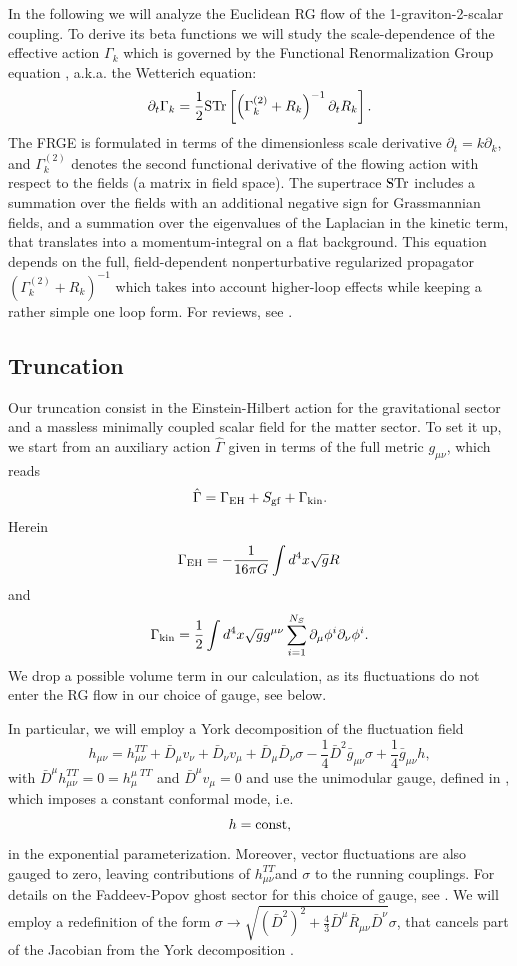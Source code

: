 \documentclass[11pt]{book} %
\newcommand{\be}{\begin{equation}}
\newcommand{\ee}{\end{equation}}
\begin{document}
In the following we will analyze the Euclidean RG flow of the 1-graviton-2-scalar coupling.
To derive its beta functions we will study the scale-dependence of the effective action $\Gamma_k$ which is governed by the Functional Renormalization Group equation \cite{Wetterich:1993yh, Morris:1993qb},  a.k.a. the Wetterich equation:
\be
\partial_t \Gamma_k = \frac{1}{2} {\rm STr} \left[\left( \Gamma_k^{(2)}+R_k\right)^{-1} \partial_t R_k \right].
\ee
The FRGE is formulated in terms of the dimensionless scale derivative $\partial_t = k\partial_k$, and $\Gamma_k^{(2)}$ denotes the second functional derivative of the flowing action with respect to the fields (a matrix in field space).
The supertrace $\rm STr$ includes a summation over the fields with an additional negative sign for Grassmannian fields, and a summation over the eigenvalues of the Laplacian in the kinetic term, that translates into a momentum-integral on a flat background.
This equation depends on the full, field-dependent nonperturbative regularized propagator $\left(\Gamma_k^{(2)}+R_k \right)^{-1}$ which takes into account higher-loop effects while keeping a  rather simple  one loop form.  For reviews, see \cite{FRGreviews}.

%
\subsection{Truncation}
%
Our truncation consist in the Einstein-Hilbert action for the gravitational sector and a massless minimally coupled scalar field for the matter sector. To set it up, we start from an  auxiliary action $\hat{\Gamma}$ given in terms of the full metric $g_{\mu \nu}$, which reads
\be
\hat{\Gamma}= \Gamma_{\rm EH}+ S_{\rm gf} + \Gamma_{\rm kin}.
\ee
Herein
\be
\Gamma_{\rm EH} = -\frac{1}{16 \pi G} \int d^4x \sqrt{g} R\,
\ee
and
\be
\Gamma_{\rm kin} = \frac{1}{2} \int d^4x \sqrt{g} g^{\mu \nu}\sum_{i=1}^{N_S}\partial_{\mu}\phi^i \partial_{\nu}\phi^i.
\ee
We drop a possible volume term in our calculation, as its fluctuations do not enter the RG flow in our choice of gauge, see below.

In particular, we will employ a York decomposition of the fluctuation field
\be
h_{\mu \nu} = h_{\mu \nu}^{TT} + \bar{D}_{\mu}v_{\nu}+ \bar{D}_{\nu}v_{\mu} + \bar{D}_{\mu}\bar{D}_{\nu}\sigma - \frac{1}{4}\bar{D}^2 \bar{g}_{\mu \nu}\sigma + \frac{1}{4}\bar{g}_{\mu \nu}h,
\ee
with $\bar{D}^{\mu}h_{\mu \nu}^{TT}=0=h^{\mu\, \, TT}_{\mu}$ and $\bar{D}^{\mu}v_{\mu}=0$
and  use the unimodular gauge, defined in \cite{Percacci:2015wwa}, which imposes a constant conformal mode, i.e.
\be
h=\rm const,
\ee
in the exponential parameterization. Moreover, vector fluctuations are also gauged to zero, leaving contributions of $h_{\mu \nu}^{TT}$and $\sigma$ to the running couplings. For details on the Faddeev-Popov ghost sector for this choice of gauge, see \cite{ercacci:2015wwa}.
We will employ a redefinition of the form $ \sigma \rightarrow \sqrt{(\bar{D}^{2})^2+\frac{4}{3}\bar{D}^{\mu}\bar{R}_{\mu \nu}\bar{D}^{\nu}} \sigma$, that cancels part of the Jacobian from the York decomposition \cite{Dou:1997fg}.
\end{document}
